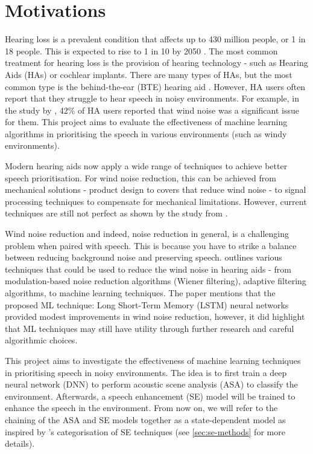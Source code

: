 \documentclass[logo,bsc,singlespacing,parskip,online]{infthesis}
\begin{document}
\section{Motivations}
Hearing loss is a prevalent condition that affects up to 430 million people, or 1 in 18 people. This is expected 
to rise to 1 in 10 by 2050 \citep{WHO2024deafness}.
The most common treatment for hearing loss is the 
provision of hearing technology - such as Hearing Aids (HAs) or cochlear implants.
There are many types of HAs, but the most common
type is the behind-the-ear (BTE) hearing aid \citep{Kochkin2010MarkeTrak8}.
However, HA users often report that they struggle to hear speech
in noisy environments. For example, in the study by \citet{Kochkin2010MarkeTrak8},
42\% of HA users reported that wind noise was a significant issue for them.
This project aims to evaluate the effectiveness of machine learning algorithms
in prioritising the speech in various environments (such as windy environments).

Modern hearing aids now apply a wide range of techniques to achieve 
better speech prioritisation. For wind noise reduction, this can be achieved 
from mechanical solutions - product design to covers that reduce wind noise - to 
signal processing techniques to compensate for mechanical limitations.
However, current techniques are still not perfect as shown by the study from \citet{Kochkin2010MarkeTrak8}.

Wind noise reduction and indeed, noise reduction in general, is a challenging problem
when paired with speech. This is because you have 
to strike a balance between reducing background noise and
preserving speech. 
\citet{Korhonen2021WindNoise} outlines 
various techniques that could be used to reduce the wind noise in hearing aids -
from modulation-based noise reduction algorithms (Wiener filtering),
adaptive filtering algorithms, to machine learning techniques.
The paper mentions that the proposed ML technique:
Long Short-Term Memory (LSTM) neural networks provided
modest improvements in wind noise reduction, however, it did highlight
that ML techniques may still have utility through further research 
and careful algorithmic choices. 

This project aims to investigate the effectiveness of machine learning techniques 
in prioritising speech in noisy environments. The idea is to 
first train a deep neural network (DNN) to perform acoustic scene analysis (ASA) to classify the environment.
Afterwards, a speech enhancement (SE) model will be trained to enhance the speech in the environment.
From now on, we will refer to the chaining of the ASA and SE models together as a state-dependent model
as inspired by \citet{katagiri_handbook_2000}'s categorisation of SE techniques (see \ref{sec:se-methods} for more details).
\end{document}

